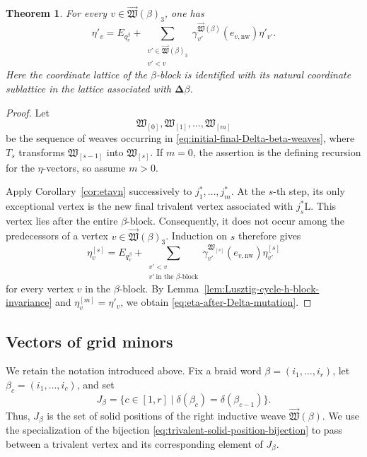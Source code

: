 \documentclass[12pt, reqno]{amsart}
\theoremstyle{plain}
\newtheorem{theorem}{Theorem}[section]
\theoremstyle{definition}
\numberwithin{equation}{section}
\begin{document}
\begin{theorem}\label{thm:eta-after-Delta-mutation}
For every
\(v\in\overrightarrow{\mathfrak W}(\beta)_3\), one has
\begin{equation}\label{eq:eta-after-Delta-mutation}
    \eta'_v
    =
    E_{q_v^\beta}
    +
    \sum_{\substack{
        v'\in\overrightarrow{\mathfrak W}(\beta)_3\\
        v'<v}}
    \gamma_{v'}^{\overrightarrow{\mathfrak W}(\beta)}
        (e_{v,\mathrm{nw}})\eta'_{v'}.
\end{equation}
Here the coordinate lattice of the \(\beta\)-block is identified with
its natural coordinate sublattice in the lattice associated with
\(\boldsymbol{\Delta}\beta\).
\end{theorem}

\begin{proof}
Let
\[
    \mathfrak W_{[0]},\mathfrak W_{[1]},\ldots,
    \mathfrak W_{[m]}
\]
be the sequence of weaves occurring in
\eqref{eq:initial-final-Delta-beta-weaves}, where \(T_s\) transforms
\(\mathfrak W_{[s-1]}\) into \(\mathfrak W_{[s]}\). If \(m=0\),
the assertion is the defining recursion for the \(\eta\)-vectors, so
assume \(m>0\).

Apply Corollary~\ref{cor:etavn} successively to
\(j_1^*,\ldots,j_m^*\). At the \(s\)-th step, its only exceptional
vertex is the new final trivalent vertex associated with
\(j_s^*\mathrm L\). This vertex lies after the entire \(\beta\)-block.
Consequently, it does not occur among the predecessors of a vertex
\(v\in\overrightarrow{\mathfrak W}(\beta)_3\). Induction on \(s\)
therefore gives
\begin{equation}\label{eq:eta-recursion-at-stage-s}
    \eta_v^{[s]}
    =
     E_{q_v^\beta}
    +
    \sum_{\substack{
        v'<v\\
        v'\ \text{in the \(\beta\)-block}}}
    \gamma_{v'}^{\mathfrak W_{[s]}}
        (e_{v,\mathrm{nw}})
    \eta_{v'}^{[s]}
\end{equation}
for every vertex \(v\) in the \(\beta\)-block.
By Lemma~\ref{lem:Lusztig-cycle-h-block-invariance} and \(\eta_v^{[m]}=\eta'_v\), we obtain
\eqref{eq:eta-after-Delta-mutation}.
\end{proof}


\subsection{Vectors of grid minors}
\label{subsec:vectors-grid-minors}

We retain the notation introduced above. Fix a braid word
\(\beta=(i_1,\ldots,i_r)\), let
\(\beta_c=(i_1,\ldots,i_c)\), and set
\[
J_\beta
=
\bigl\{
c\in[1,r]
\mid
\delta(\beta_c)=\delta(\beta_{c-1})
\bigr\}.
\]
Thus, \(J_\beta\) is the set of solid positions of the right inductive
weave \(\overrightarrow{\mathfrak W}(\beta)\). We use the
specialization of the bijection
\eqref{eq:trivalent-solid-position-bijection} to pass between a
trivalent vertex and its corresponding element of \(J_\beta\).
\end{document}
